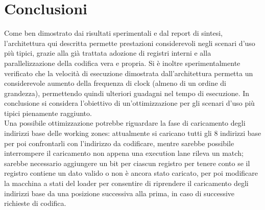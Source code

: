 \documentclass[10pt,english, openany]{book}
\begin{document}
\chapter{Conclusioni}

Come ben dimostrato dai risultati sperimentali e dal report di sintesi, l'architettura qui descritta permette prestazioni considerevoli negli scenari d’uso più tipici, grazie alla già trattata adozione di registri interni e alla parallelizzazione della codifica vera e propria. Si è inoltre sperimentalmente verificato che la velocità di esecuzione dimostrata dall’architettura permetta un considerevole aumento della frequenza di clock (almeno di un ordine di grandezza), permettendo quindi ulteriori guadagni nel tempo di esecuzione.
In conclusione si considera l'obiettivo di un’ottimizzazione per gli scenari d’uso più tipici pienamente raggiunto.\\
Una possibile ottimizzazione potrebbe riguardare la fase di caricamento degli indirizzi base delle working zones: attualmente si caricano tutti gli 8 indirizzi base per poi confrontarli con l’indirizzo da codificare, mentre sarebbe possibile interrompere il caricamento non appena una execution lane rileva un match; sarebbe necessario aggiungere un bit per ciascun registro per tenere conto se il registro contiene un dato valido o non è ancora stato caricato, per poi modificare la macchina a stati del loader per consentire di riprendere il caricamento degli indirizzi base da una posizione successiva alla prima, in caso di successive richieste di codifica.




\pagebreak
\end{document}
